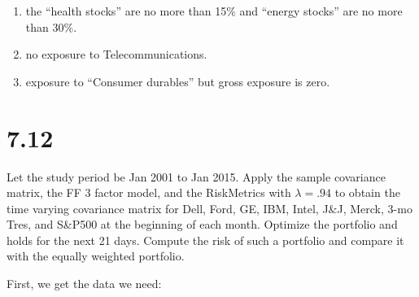 \documentclass[11pt,]{article}
\providecommand{\tightlist}{%
\setlength{\itemsep}{0pt}\setlength{\parskip}{0pt}}
\begin{document}
\begin{enumerate}
\def\labelenumi{\arabic{enumi}.}
\tightlist
\item
  the ``health stocks'' are no more than 15\% and ``energy stocks'' are
  no more than 30\%.
\item
  no exposure to Telecommunications.
\item
  exposure to ``Consumer durables'' but gross exposure is zero.
\end{enumerate}

\hypertarget{section-3}{%
\section{7.12}\label{section-3}}

Let the study period be Jan 2001 to Jan 2015. Apply the sample
covariance matrix, the FF 3 factor model, and the RiskMetrics with
\(\lambda = .94\) to obtain the time varying covariance matrix for Dell,
Ford, GE, IBM, Intel, J\&J, Merck, 3-mo Tres, and S\&P500 at the
beginning of each month. Optimize the portfolio and holds for the next
21 days. Compute the risk of such a portfolio and compare it with the
equally weighted portfolio.

First, we get the data we need:
\end{document}
